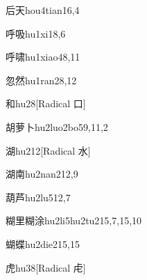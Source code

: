 \begin{verbete}{后天}{hou4tian1}{6,4}
\end{verbete}

\begin{verbete}{呼吸}{hu1xi1}{8,6}
\end{verbete}

\begin{verbete}{呼啸}{hu1xiao4}{8,11}
\end{verbete}

\begin{verbete}{忽然}{hu1ran2}{8,12}
\end{verbete}

\begin{verbete}{和}{hu2}{8}[Radical 口]
\end{verbete}

\begin{verbete}{胡萝卜}{hu2luo2bo5}{9,11,2}
\end{verbete}

\begin{verbete}{湖}{hu2}{12}[Radical 水]
\end{verbete}

\begin{verbete}{湖南}{hu2nan2}{12,9}
\end{verbete}

\begin{verbete}{葫芦}{hu2lu5}{12,7}
\end{verbete}

\begin{verbete}{糊里糊涂}{hu2li5hu2tu2}{15,7,15,10}
\end{verbete}

\begin{verbete}{蝴蝶}{hu2die2}{15,15}
\end{verbete}

\begin{verbete}{虎}{hu3}{8}[Radical ⾌]
\end{verbete}

